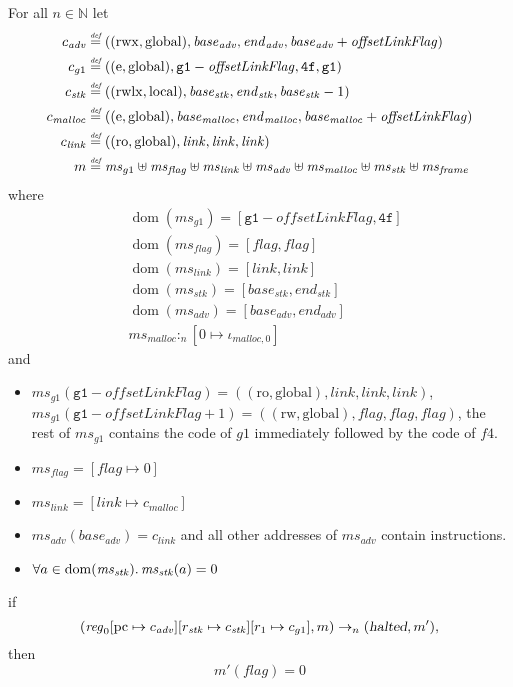 \documentclass[a4paper]{article}
\newcommand{\update}[2]{[#1 \mapsto #2]}
\newcommand{\defeq}{\stackrel{\textit{\tiny{def}}}{=}}
\DeclareMathOperator{\dom}{dom}
\newcommand{\var}[1]{\mathit{#1}}
\newcommand{\hs}{\var{ms}}
\newcommand{\ms}{\hs}
\newcommand{\pcreg}{\mathrm{pc}}
\newcommand{\start}{\var{base}}
\newcommand{\addrend}{\var{end}}
\newcommand{\reg}{\var{reg}}
\newcommand{\heap}{\var{mem}}
\newcommand{\adv}{\var{adv}}
\newcommand{\link}{\var{link}}
\newcommand{\stk}{\var{stk}}
\newcommand{\flag}{\var{flag}}
\newcommand{\pwl}{\var{pwl}}
\newcommand{\olf}{\var{offsetLinkFlag}}
\newcommand{\halted}{\textsl{halted}}
\newcommand{\heapSat}[3][\heap]{#1 :_{#2} #3}
\newcommand{\memSat}[3][n]{\heapSat[#2]{#1}{#3}}
\newcommand{\codelabel}[1]{\mathit{#1}}
\newcommand{\malloc}{\codelabel{malloc}}
\newcommand{\nats}{\mathbb{N}}
\newcommand{\plainperm}[1]{\mathrm{#1}}
\newcommand{\readonly}{\plainperm{ro}}
\newcommand{\readwrite}{\plainperm{rw}}
\newcommand{\entry}{\plainperm{e}}
\newcommand{\rwx}{\plainperm{rwx}}
\newcommand{\rwlx}{\plainperm{rwlx}}
\newcommand{\local}{\plainperm{local}}
\newcommand{\glob}{\plainperm{global}}
\newcommand{\step}[1][]{\rightarrow_{#1}}
\begin{document}
\begin{lemma}[Correctness of $g1$]
  \label{lem:correctness-g1}
  For all $n \in \nats$
  let
  \begin{align*}
    c_{\var{adv}} & \defeq ((\rwx,\glob),\start_{\adv},\addrend_{\adv},\start_{\adv}+\olf) \\
    c_{g1} & \defeq ((\entry,\glob),\mathtt{g1}-\olf,\mathtt{4f},\mathtt{g1}) \\
    c_\stk & \defeq ((\rwlx,\local),\start_\stk,\addrend_\stk,\start_\stk-1) \\
    c_\malloc & \defeq ((\entry,\glob),\start_\malloc,\addrend_\malloc,\start_\malloc+\olf) \\
    c_\link & \defeq ((\readonly,\glob),\link,\link,\link) \\
    m & \defeq \hs_{g1} \uplus 
        \ms_\flag \uplus                
        \ms_\link \uplus 
        \ms_\adv \uplus 
        \ms_\malloc \uplus 
        \ms_\stk \uplus
        \ms_{\var{frame}} 
  \end{align*}
  where 
  \begin{align*}
    &\dom(\hs_{g1}) = [\mathtt{g1}-\olf,\mathtt{4f}] \\
    &\dom(\hs_\flag) = [\flag,\flag] \\
    &\dom(\ms_\link) = [\link,\link]\\
    &\dom(\ms_\stk) = [\start_\stk, \addrend_\stk]\\
    &\dom(\hs_{\adv}) = [\start_\adv,\addrend_\adv] \\
    &\heapSat[\hs_{\malloc}]{n}{[0 \mapsto \iota_{\malloc,0}]}
  \end{align*}
  and
  \begin{itemize}
  \item $\ms_{g1}(\mathtt{g1}-\olf) = ((\readonly,\glob),\link,\link,\link)$, $\ms_{g1}(\mathtt{g1}-\olf+1) = ((\readwrite,\glob),\flag,\flag,\flag)$, the rest of $\hs_{g1}$ contains the code of $g1$ immediately followed by the code of $f4$.
  \item $\ms_\flag = [\flag \mapsto 0]$
  \item $\ms_{\var{link}} = [\link \mapsto c_\malloc]$
  \item $\hs_\adv(\start_\adv) = c_\link$ and all other addresses of $\ms_\adv$ contain instructions.
  \item $\forall a \in \dom(\ms_\stk) \ldotp \ms_\stk(a) = 0$ %
  \end{itemize}
  if 
  \[
    (\reg_0\update{\pcreg}{c_\adv}\update{r_\stk}{c_\stk}\update{r_1}{c_{g1}},m) \step[n] (\halted,m'),
  \]
  then
  \[
    m'(\flag) = 0
  \]  
\end{lemma}
\end{document}
